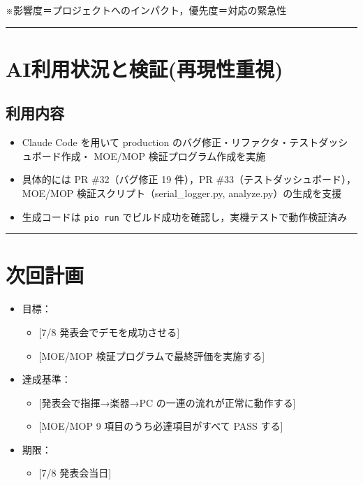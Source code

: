 \documentclass[uplatex,dvipdfmx,a4paper,11pt]{jsarticle}
\newcommand{\sectionrule}{\par\medskip\noindent\rule{\linewidth}{0.6pt}\par\medskip}
\begin{document}
\medskip
※影響度＝プロジェクトへのインパクト，優先度＝対応の緊急性

\sectionrule

\section{AI利用状況と検証(再現性重視)}

\subsection{利用内容}

\begin{itemize}
  \item Claude Code を用いて production のバグ修正・リファクタ・テストダッシュボード作成・
        MOE/MOP 検証プログラム作成を実施
  \item 具体的には PR \#32（バグ修正 19 件），PR \#33（テストダッシュボード），
        MOE/MOP 検証スクリプト（serial\_logger.py, analyze.py）の生成を支援
  \item 生成コードは \texttt{pio run} でビルド成功を確認し，実機テストで動作検証済み
\end{itemize}

\sectionrule

\section{次回計画}

\begin{itemize}
  \item 目標：
    \begin{itemize}
      \item {}[7/8 発表会でデモを成功させる]
      \item {}[MOE/MOP 検証プログラムで最終評価を実施する]
    \end{itemize}
  \item 達成基準：
    \begin{itemize}
      \item {}[発表会で指揮→楽器→PC の一連の流れが正常に動作する]
      \item {}[MOE/MOP 9 項目のうち必達項目がすべて PASS する]
    \end{itemize}
  \item 期限：
    \begin{itemize}
      \item {}[7/8 発表会当日]
    \end{itemize}
\end{itemize}
\end{document}
